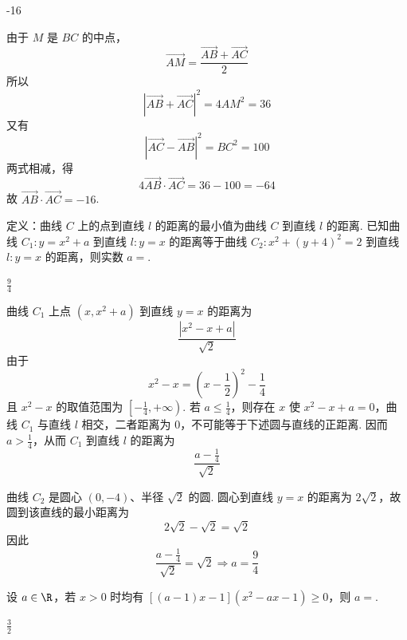 \begin{answer}
-16
\end{answer}

\begin{solution}
由于 \(M\) 是 \(BC\) 的中点，
\[
\overrightarrow{AM}=\frac{\overrightarrow{AB}+\overrightarrow{AC}}2
\]
所以
\[
|\overrightarrow{AB}+\overrightarrow{AC}|^2=4AM^2=36
\]
又有
\[
|\overrightarrow{AC}-\overrightarrow{AB}|^2=BC^2=100
\]
两式相减，得
\[
4\overrightarrow{AB}\cdot\overrightarrow{AC}=36-100=-64
\]
故 \(\overrightarrow{AB}\cdot\overrightarrow{AC}=-16\).
\end{solution}

\begin{problem}
定义：曲线 \(C\) 上的点到直线 \(l\) 的距离的最小值为曲线 \(C\) 到直线 \(l\) 的距离. 已知曲线 \( C_{1}: y = x^{2} + a \) 到直线 \(l: y = x\) 的距离等于曲线 \( C_{2}: x^{2} + (y + 4)^{2} = 2 \) 到直线 \(l: y = x\) 的距离，则实数 \( a = \)\fillinblank{}.
\end{problem}

\begin{answer}
\(\frac{9}{4}\)
\end{answer}

\begin{solution}
曲线 \(C_1\) 上点 \((x,x^2+a)\) 到直线 \(y=x\) 的距离为
\[
\frac{|x^2-x+a|}{\sqrt2}
\]
由于
\[
x^2-x=\left(x-\frac12\right)^2-\frac14
\]
且 \(x^2-x\) 的取值范围为 \(\left[-\frac14,+\infty\right)\). 若 \(a\leqslant\frac14\)，则存在 \(x\) 使 \(x^2-x+a=0\)，曲线 \(C_1\) 与直线 \(l\) 相交，二者距离为 \(0\)，不可能等于下述圆与直线的正距离. 因而 \(a>\frac14\)，从而 \(C_1\) 到直线 \(l\) 的距离为
\[
\frac{a-\frac14}{\sqrt2}
\]

曲线 \(C_2\) 是圆心 \((0,-4)\)、半径 \(\sqrt2\) 的圆. 圆心到直线 \(y=x\) 的距离为 \(2\sqrt2\)，故圆到该直线的最小距离为
\[
2\sqrt2-\sqrt2=\sqrt2
\]
因此
\[
\frac{a-\frac14}{\sqrt2}=\sqrt2
\Longrightarrow a=\frac94
\]
\end{solution}

\begin{problem}
设 \(a \in \R\)，若 \(x > 0\) 时均有 \([(a - 1)x - 1](x^2 - ax - 1) \geqslant 0\)，则 \(a = \)\fillinblank{}.
\end{problem}

\begin{answer}
\(\frac{3}{2}\)
\end{answer}

